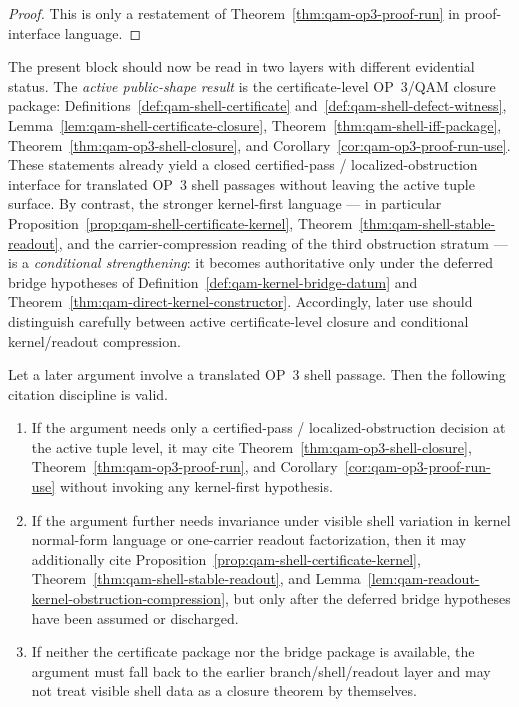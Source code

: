 \begin{proof}
This is only a restatement of Theorem~\ref{thm:qam-op3-proof-run} in proof-interface language.
\end{proof}


\begin{remark}\label{rem:qam-op3-status-separation}
The present block should now be read in two layers with different evidential status. The \emph{active public-shape result} is the certificate-level OP~3/QAM closure package: Definitions~\ref{def:qam-shell-certificate} and~\ref{def:qam-shell-defect-witness}, Lemma~\ref{lem:qam-shell-certificate-closure}, Theorem~\ref{thm:qam-shell-iff-package}, Theorem~\ref{thm:qam-op3-shell-closure}, and Corollary~\ref{cor:qam-op3-proof-run-use}. These statements already yield a closed certified-pass / localized-obstruction interface for translated OP~3 shell passages without leaving the active tuple surface. By contrast, the stronger kernel-first language --- in particular Proposition~\ref{prop:qam-shell-certificate-kernel}, Theorem~\ref{thm:qam-shell-stable-readout}, and the carrier-compression reading of the third obstruction stratum --- is a \emph{conditional strengthening}: it becomes authoritative only under the deferred bridge hypotheses of Definition~\ref{def:qam-kernel-bridge-datum} and Theorem~\ref{thm:qam-direct-kernel-constructor}. Accordingly, later use should distinguish carefully between active certificate-level closure and conditional kernel/readout compression.
\end{remark}

\begin{proposition}\label{prop:qam-op3-citation-use-rule}
Let a later argument involve a translated OP~3 shell passage. Then the following citation discipline is valid.
\begin{enumerate}[leftmargin=2em,label=(\roman*)]
 \item If the argument needs only a certified-pass / localized-obstruction decision at the active tuple level, it may cite Theorem~\ref{thm:qam-op3-shell-closure}, Theorem~\ref{thm:qam-op3-proof-run}, and Corollary~\ref{cor:qam-op3-proof-run-use} without invoking any kernel-first hypothesis.
 \item If the argument further needs invariance under visible shell variation in kernel normal-form language or one-carrier readout factorization, then it may additionally cite Proposition~\ref{prop:qam-shell-certificate-kernel}, Theorem~\ref{thm:qam-shell-stable-readout}, and Lemma~\ref{lem:qam-readout-kernel-obstruction-compression}, but only after the deferred bridge hypotheses have been assumed or discharged.
 \item If neither the certificate package nor the bridge package is available, the argument must fall back to the earlier branch/shell/readout layer and may not treat visible shell data as a closure theorem by themselves.
\end{enumerate}
\end{proposition}

